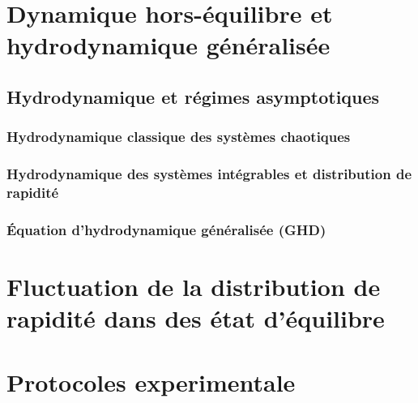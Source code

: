 \chapter{Dynamique hors-équilibre et hydrodynamique généralisée}
\minitoc
\section{Hydrodynamique et régimes asymptotiques}

\subsection{Hydrodynamique classique des systèmes chaotiques}
\subsection{Hydrodynamique des systèmes intégrables et distribution de rapidité}
\subsection{Équation d’hydrodynamique généralisée (GHD)}

\chapter{Fluctuation de la distribution de rapidité dans des état d'équilibre} 



\chapter{Protocoles experimentale}
\minitoc



